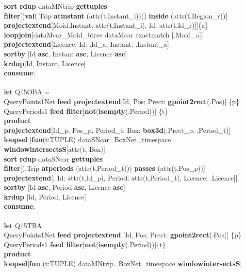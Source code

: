 \documentclass[a4paper]{article}
\newcommand{\op}[1]{\textbf{#1}}
\begin{document}
\begin{scriptsize}
\begin{tabbing}
\>\>\op{sort rdup} dataMNtrip \op{gettuples}\\
\>\>\op{filter}[(\op{val}(.Trip \op{atinstant} (attr(t,Instant\_i))))
\op{inside} (attr(t,Region\_r))]\\
\>\>\op{projectextend}[Moid;Instant: attr(t,Instant\_i), Id:
attr(t,Id\_r)]]\{a\}\\
\>\op{loopjoin}[dataMcar\_Moid\_btree dataMcar exactmatch [.Moid\_a]]\\
\>\op{projectextend}[Licence; Id: .Id\_a, Instant: .Instant\_a]\\
\>\op{sortby} [Id \op{asc}, Instant \op{asc}, Licence \op{asc}]\\
\>\op{krdup}[Id, Instant, Licence]\\
\op{consume};\\
\\
\op{let} Q15OBA =\\
\>QueryPoints1Net \op{feed projectextend}[Id, Pos; Prect:
\op{gpoint2rect}(.Pos)] \{p\}\\
\>QueryPeriods1 \op{feed filter}[\op{not}(\op{isempty}(.Period))] \{t\}\\
\>\op{product}\\
\>\op{projectextend}[Id\_p, Pos\_p, Period\_t; Box: \op{box3d}(.Prect\_p,
.Period\_t)]\\
\>\op{loopsel} [\op{fun}(t:TUPLE) dataSNcar\_BoxNet\_timespace
\op{windowintersectsS}[attr(t, Box)]\\
\>\>\op{sort rdup} dataSNcar \op{gettuples}\\
\>\>\op{filter}[(.Trip \op{atperiods} (attr(t,Period\_t))) \op{passes}
(attr(t,Pos\_p))]\\
\>\>\op{projectextend}[; Id: attr(t,Id\_p), Period: attr(t,Period\_t), Licence:
.Licence]]\\
\>\op{sortby} [Id \op{asc}, Period \op{asc}, Licence \op{asc}]\\
\>\op{krdup} [Id, Period, Licence]\\
\op{consume};\\
\\
\op{let} Q15TBA =\\
\>QueryPoints1Net \op{feed projectextend} [Id, Pos; Prect:
\op{gpoint2rect}(.Pos)] \{p\}\\
\>QueryPeriods1 \op{feed filter}[\op{not}(\op{isempty}(.Period))]\{t\}\\
\>\op{product}\\
\>\op{loopsel}[\op{fun} (t:TUPLE) dataMNtrip\_BoxNet\_timespace
\op{windowintersectsS}[\\

\end{tabbing}
\end{scriptsize}
\end{document}
